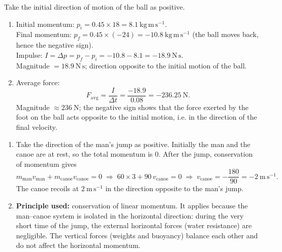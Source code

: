 \documentclass[11pt]{article}
\begin{document}
\begin{corrige}
Take the initial direction of motion of the ball as positive.
\begin{enumerate}
\item Initial momentum: $p_i = 0.45 \times 18 = 8.1\ \mathrm{kg\,m\,s^{-1}}$. \\
Final momentum: $p_f = 0.45 \times (-24) = -10.8\ \mathrm{kg\,m\,s^{-1}}$ (the ball moves back, hence the negative sign). \\
Impulse: $I = \Delta p = p_f - p_i = -10.8 - 8.1 = -18.9\ \mathrm{N\,s}$. \\
Magnitude $= 18.9\ \mathrm{N\,s}$; direction opposite to the initial motion of the ball.

\item Average force:
\[ F_{\mathrm{avg}} = \frac{I}{\Delta t} = \frac{-18.9}{0.08} = -236.25\ \mathrm{N}. \]
Magnitude $\approx 236\ \mathrm{N}$; the negative sign shows that the force exerted by the foot on the ball acts opposite to the initial motion, i.e. in the direction of the final velocity.
\end{enumerate}
\end{corrige}

\begin{corrige}
\begin{enumerate}
\item Take the direction of the man's jump as positive. Initially the man and the canoe are at rest, so the total momentum is $0$. After the jump, conservation of momentum gives
\[ m_{\mathrm{man}}v_{\mathrm{man}} + m_{\mathrm{canoe}}v_{\mathrm{canoe}} = 0
\;\Rightarrow\; 60 \times 3 + 90\,v_{\mathrm{canoe}} = 0
\;\Rightarrow\; v_{\mathrm{canoe}} = -\frac{180}{90} = -2\ \mathrm{m\,s^{-1}}. \]
The canoe recoils at $2\ \mathrm{m\,s^{-1}}$ in the direction opposite to the man's jump.

\item \textbf{Principle used:} conservation of linear momentum. It applies because the man–canoe system is isolated in the horizontal direction: during the very short time of the jump, the external horizontal forces (water resistance) are negligible. The vertical forces (weights and buoyancy) balance each other and do not affect the horizontal momentum.
\end{enumerate}
\end{corrige}
\end{document}
